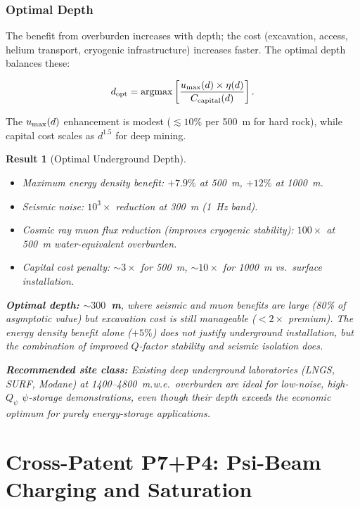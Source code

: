 \documentclass[aps,prd,twocolumn,superscriptaddress]{revtex4-2}
\newtheorem{result}{Result}
\begin{document}
\subsubsection{Optimal Depth}

The benefit from overburden increases with depth; the cost (excavation,
access, helium transport, cryogenic infrastructure) increases faster.
The optimal depth balances these:

\begin{equation}
d_{\rm opt} = \mathrm{argmax}
\left[\frac{u_{\rm max}(d)\times\eta(d)}{C_{\rm capital}(d)}\right].
\end{equation}

The $u_{\rm max}(d)$ enhancement is modest ($\lesssim 10\%$ per 500~m
for hard rock), while capital cost scales as $d^{1.5}$ for deep mining.

\begin{result}[Optimal Underground Depth]
\begin{itemize}
\item Maximum energy density benefit: $+7.9\%$ at 500~m, $+12\%$ at 1000~m.
\item Seismic noise: $10^3\times$ reduction at 300~m (1~Hz band).
\item Cosmic ray muon flux reduction (improves cryogenic stability):
$100\times$ at 500~m water-equivalent overburden.
\item Capital cost penalty: $\sim 3\times$ for 500~m, $\sim 10\times$ for 1000~m
vs.\ surface installation.
\end{itemize}

\textbf{Optimal depth: $\sim 300$~m}, where seismic and muon benefits
are large (80\% of asymptotic value) but excavation cost is still
manageable ($< 2\times$ premium).  The energy density benefit alone
($+5\%$) does not justify underground installation, but the combination
of improved $Q$-factor stability and seismic isolation does.

\textbf{Recommended site class:} Existing deep underground laboratories
(LNGS, SURF, Modane) at 1400--4800~m.w.e.\ overburden are ideal for
low-noise, high-$Q_\psi$ $\psi$-storage demonstrations, even though
their depth exceeds the economic optimum for purely energy-storage
applications.
\end{result}

\section{Cross-Patent P7+P4: Psi-Beam Charging and Saturation}
\label{sec:p7p4}
\end{document}
